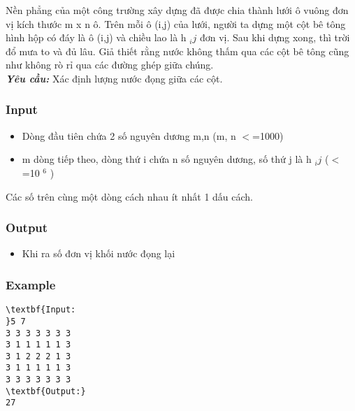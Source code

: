 

Nền phẳng của một công trường xây dựng đã được chia thành lưới ô vuông đơn vị kích thước m x n ô. Trên mỗi ô (i,j) của lưới, người ta dựng một cột bê tông hình hộp có đáy là ô (i,j) và chiều lao là h $_ ij $ đơn vị. Sau khi dựng xong, thì trời đổ mưa to và đủ lâu. Giả thiết rằng nước không thấm qua các cột bê tông cũng như không rò rỉ qua các đường ghép giữa chúng.
\\\textbf{\emph{Yêu cầu: }} Xác định lượng nước đọng giữa các cột.

\subsubsection{Input}
\begin{itemize}
	\item Dòng đầu tiên chứa 2 số nguyên dương m,n (m, n $<$=1000)
	\item m dòng tiếp theo, dòng thứ i chứa n số nguyên dương, số thứ j là h $_ ij $ ($<$=10 $^ 6 $ )
\end{itemize}

Các số trên cùng một dòng cách nhau ít nhất 1 dấu cách.

\subsubsection{Output}
\begin{itemize}
	\item Khi ra số đơn vị khối nước đọng lại
\end{itemize}

\subsubsection{Example}
\begin{verbatim}
\textbf{Input:
}5 7
3 3 3 3 3 3 3
3 1 1 1 1 1 3
3 1 2 2 2 1 3
3 1 1 1 1 1 3
3 3 3 3 3 3 3
\textbf{Output:}
27
\end{verbatim}